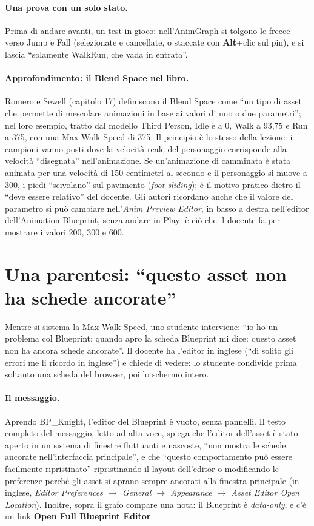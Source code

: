 \paragraph{Una prova con un solo stato.} Prima di andare avanti, un test in gioco:
nell'AnimGraph si tolgono le frecce verso Jump e Fall (selezionate e cancellate, o
staccate con \textbf{Alt}+clic sul pin), e si lascia ``solamente WalkRun, che vada in
entrata''.

\paragraph{Approfondimento: il Blend Space nel libro.} Romero e Sewell (capitolo 17)
definiscono il Blend Space come ``un tipo di asset che permette di mescolare animazioni
in base ai valori di uno o due parametri''; nel loro esempio, tratto dal modello Third
Person, Idle è a 0, Walk a 93,75 e Run a 375, con una Max Walk Speed di 375. Il principio
è lo stesso della lezione: i campioni vanno posti dove la velocità reale del personaggio
corrisponde alla velocità ``disegnata'' nell'animazione. Se un'animazione di camminata è
stata animata per una velocità di 150 centimetri al secondo e il personaggio si muove a
300, i piedi ``scivolano'' sul pavimento (\emph{foot sliding}); è il motivo pratico
dietro il ``deve essere relativo'' del docente. Gli autori ricordano anche che il valore
del parametro si può cambiare nell'\emph{Anim Preview Editor}, in basso a destra
nell'editor dell'Animation Blueprint, senza andare in Play: è ciò che il docente fa per
mostrare i valori 200, 300 e 600.

\section{Una parentesi: ``questo asset non ha schede ancorate''}
\label{ue9:sec:layout}

Mentre si sistema la Max Walk Speed, uno studente interviene: ``io ho un problema col
Blueprint: quando apro la scheda Blueprint mi dice: questo asset non ha ancora schede
ancorate''. Il docente ha l'editor in inglese (``di solito gli errori me li ricordo in
inglese'') e chiede di vedere: lo studente condivide prima soltanto una scheda del
browser, poi lo schermo intero.

\paragraph{Il messaggio.} Aprendo BP\_Knight, l'editor del Blueprint è vuoto, senza
pannelli. Il testo completo del messaggio, letto ad alta voce, spiega che l'editor
dell'asset è stato aperto in un sistema di finestre fluttuanti e nascoste, ``non mostra
le schede ancorate nell'interfaccia principale'', e che ``questo comportamento può essere
facilmente ripristinato'' ripristinando il layout dell'editor o modificando le preferenze
perché gli asset si aprano sempre ancorati alla finestra principale (in inglese,
\emph{Editor Preferences $\rightarrow$ General $\rightarrow$ Appearance $\rightarrow$
Asset Editor Open Location}). Inoltre, sopra il grafo compare una nota: il Blueprint è
\emph{data-only}, e c'è un link \textbf{Open Full Blueprint Editor}.

